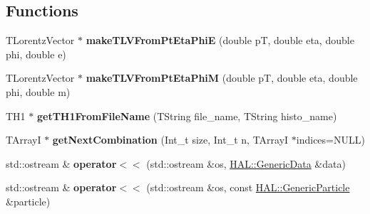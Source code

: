 \subsection*{Functions}
\begin{DoxyCompactItemize}
\item 
\hypertarget{namespace_h_a_l_aff015dfdeff19d0696ae1b3d6fecf49a}{T\-Lorentz\-Vector $\ast$ {\bfseries make\-T\-L\-V\-From\-Pt\-Eta\-Phi\-E} (double p\-T, double eta, double phi, double e)}\label{namespace_h_a_l_aff015dfdeff19d0696ae1b3d6fecf49a}

\item 
\hypertarget{namespace_h_a_l_a8b1948d67b09632a981e5c39eebb4470}{T\-Lorentz\-Vector $\ast$ {\bfseries make\-T\-L\-V\-From\-Pt\-Eta\-Phi\-M} (double p\-T, double eta, double phi, double m)}\label{namespace_h_a_l_a8b1948d67b09632a981e5c39eebb4470}

\item 
\hypertarget{namespace_h_a_l_abb1838fcb707a37ea7541d0dde9d9032}{T\-H1 $\ast$ {\bfseries get\-T\-H1\-From\-File\-Name} (T\-String file\-\_\-name, T\-String histo\-\_\-name)}\label{namespace_h_a_l_abb1838fcb707a37ea7541d0dde9d9032}

\item 
\hypertarget{namespace_h_a_l_a7f4c7ad70074df44a822af96ea4e1b1c}{T\-Array\-I $\ast$ {\bfseries get\-Next\-Combination} (Int\-\_\-t size, Int\-\_\-t n, T\-Array\-I $\ast$indices=N\-U\-L\-L)}\label{namespace_h_a_l_a7f4c7ad70074df44a822af96ea4e1b1c}

\item 
\hypertarget{namespace_h_a_l_a659c783b14f06a4ada3e27926587270c}{std\-::ostream \& {\bfseries operator$<$$<$} (std\-::ostream \&os, \hyperlink{class_h_a_l_1_1_generic_data}{H\-A\-L\-::\-Generic\-Data} \&data)}\label{namespace_h_a_l_a659c783b14f06a4ada3e27926587270c}

\item 
\hypertarget{namespace_h_a_l_a54ec71617e0c3cb17f5060d8481d61bc}{std\-::ostream \& {\bfseries operator$<$$<$} (std\-::ostream \&os, const \hyperlink{class_h_a_l_1_1_generic_particle}{H\-A\-L\-::\-Generic\-Particle} \&particle)}\label{namespace_h_a_l_a54ec71617e0c3cb17f5060d8481d61bc}


\end{DoxyCompactItemize}
